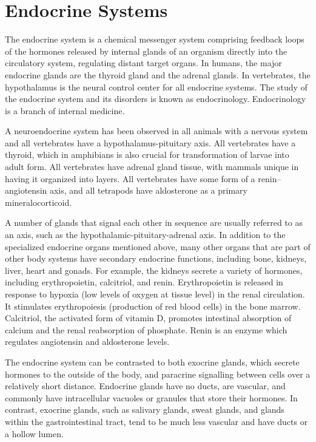 \hypertarget{endocrine-systems}{%
\chapter{Endocrine Systems}\label{endocrine-systems}}

The endocrine system is a chemical messenger system comprising feedback loops of the hormones released by internal glands of an organism directly into the circulatory system, regulating distant target organs. In humans, the major endocrine glands are the thyroid gland and the adrenal glands. In vertebrates, the hypothalamus is the neural control center for all endocrine systems. The study of the endocrine system and its disorders is known as endocrinology. Endocrinology is a branch of internal medicine.

A neuroendocrine system has been observed in all animals with a nervous system and all vertebrates have a hypothalamus-pituitary axis. All vertebrates have a thyroid, which in amphibians is also crucial for transformation of larvae into adult form. All vertebrates have adrenal gland tissue, with mammals unique in having it organized into layers. All vertebrates have some form of a renin--angiotensin axis, and all tetrapods have aldosterone as a primary mineralocorticoid.

A number of glands that signal each other in sequence are usually referred to as an axis, such as the hypothalamic-pituitary-adrenal axis. In addition to the specialized endocrine organs mentioned above, many other organs that are part of other body systems have secondary endocrine functions, including bone, kidneys, liver, heart and gonads. For example, the kidneys secrete a variety of hormones, including erythropoietin, calcitriol, and renin. Erythropoietin is released in response to hypoxia (low levels of oxygen at tissue level) in the renal circulation. It stimulates erythropoiesis (production of red blood cells) in the bone marrow. Calcitriol, the activated form of vitamin D, promotes intestinal absorption of calcium and the renal reabsorption of phosphate. Renin is an enzyme which regulates angiotensin and aldosterone levels.

The endocrine system can be contrasted to both exocrine glands, which secrete hormones to the outside of the body, and paracrine signalling between cells over a relatively short distance. Endocrine glands have no ducts, are vascular, and commonly have intracellular vacuoles or granules that store their hormones. In contrast, exocrine glands, such as salivary glands, sweat glands, and glands within the gastrointestinal tract, tend to be much less vascular and have ducts or a hollow lumen.

